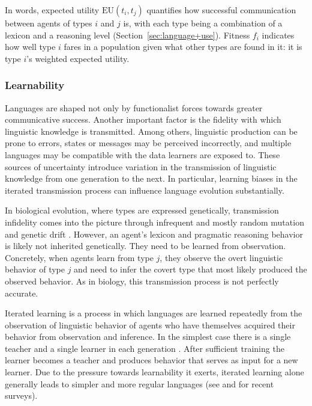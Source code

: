 \documentclass[a4paper, 11pt]{article}
\theoremstyle{Satz}
\begin{document}
In words, expected utility $\text{EU}(t_i,t_j)$ quantifies how successful communication between agents of types $i$ and $j$ is, with each type being a combination of a lexicon and a reasoning level (Section~\ref{sec:language+use}). Fitness $f_i$ indicates how well type $i$ fares in a population given what other types are found in it: it is type $i$'s weighted expected utility.

\subsubsection{Learnability}
\label{sec:learnability}
Languages are shaped not only by functionalist forces towards greater communicative success. Another
important factor is the fidelity with which linguistic knowledge is transmitted. Among others,
linguistic production can be prone to errors, states or messages may be perceived incorrectly,
and multiple languages may be compatible with the data learners are exposed to. These sources
of uncertainty introduce variation in the transmission of linguistic knowledge from one
generation to the next. In particular, learning biases in the iterated transmission process can
influence language evolution substantially.

In biological evolution, where types are expressed genetically, transmission infidelity comes
into the picture through infrequent and mostly random mutation and genetic drift \citep{kimura:1983}. However, an agent's
lexicon and pragmatic reasoning behavior is likely not inherited genetically. They need to be
learned from observation.  Concretely, when agents learn from type $j$, they observe the overt linguistic behavior of type $j$ and need to infer the covert type that most likely produced the observed behavior. As in biology, this transmission process is not perfectly accurate. 

Iterated learning is a process in which languages are learned repeatedly from the observation of linguistic behavior of agents who have themselves acquired their behavior from observation and inference. In the simplest case there is a single teacher and a single learner in each generation \citep[e.g.,][]{kirby:2001,brighton:2002}. After sufficient training the learner becomes a teacher and produces behavior that serves as input for a new learner. Due to the pressure towards learnability it exerts, iterated learning alone generally leads to simpler
and more regular languages (see \citealt{kirby+etal:2014} and \citealt{tamariz+kirby:2016} for
recent surveys).
\end{document}
